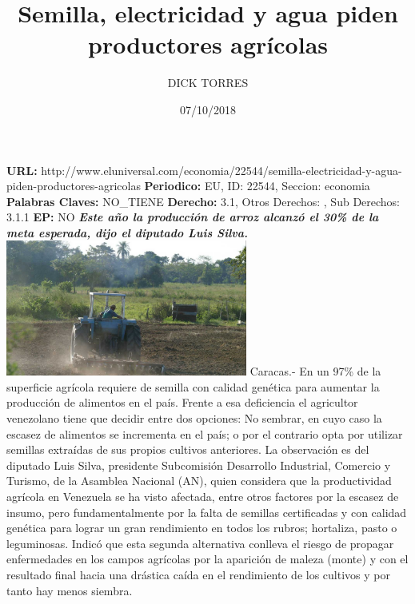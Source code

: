 \documentclass{article}%
\title{\textbf{Semilla, electricidad y agua piden productores agrícolas}}%
\author{DICK TORRES}%
\date{07/10/2018}%
\begin{document}
%
\normalsize%
\maketitle%
\textbf{URL: }%
http://www.eluniversal.com/economia/22544/semilla{-}electricidad{-}y{-}agua{-}piden{-}productores{-}agricolas\newline%
%
\textbf{Periodico: }%
EU, %
ID: %
22544, %
Seccion: %
economia\newline%
%
\textbf{Palabras Claves: }%
NO\_TIENE\newline%
%
\textbf{Derecho: }%
3.1, %
Otros Derechos: %
, %
Sub Derechos: %
3.1.1\newline%
%
\textbf{EP: }%
NO\newline%
\newline%
%
\textbf{\textit{Este año la producción de arroz alcanzó el 30\% de la meta esperada, dijo el diputado Luis Silva.}}%
\newline%
\newline%
%
\includegraphics[width=300px]{83.jpg}%
\newline%
%
Caracas.{-} En un 97\% de la superficie agrícola requiere de semilla con calidad genética para aumentar la producción de alimentos en el país.%
\newline%
%
Frente a esa deficiencia el agricultor venezolano tiene que decidir entre dos opciones: No sembrar, en cuyo caso la escasez de alimentos se incrementa en el país; o por el contrario  opta por utilizar semillas extraídas de sus propios cultivos anteriores.%
\newline%
%
La observación es del diputado Luis Silva, presidente Subcomisión Desarrollo Industrial, Comercio y Turismo, de la Asamblea Nacional (AN), quien considera que la productividad agrícola en Venezuela se ha visto afectada, entre otros factores por la escasez de insumo, pero fundamentalmente por la falta de semillas certificadas y con calidad genética para lograr un gran rendimiento en todos los rubros; hortaliza, pasto o leguminosas.%
\newline%
%
Indicó que esta segunda alternativa conlleva el riesgo de propagar enfermedades en los campos agrícolas por la aparición de maleza (monte) y con el resultado final hacia una drástica  caída en el rendimiento de los cultivos y por tanto hay menos siembra.%
\end{document}
